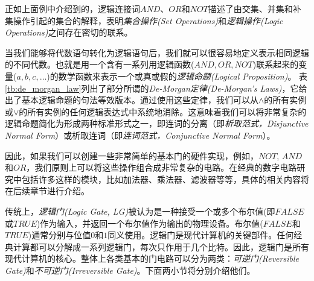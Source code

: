 正如上面例中介绍到的，逻辑连接词$AND$、$OR$和$NOT$描述了由交集、并集和补集操作引起的集合的解释，表明\emph{集合操作(Set Operations)}和\emph{逻辑操作(Logic Operations)}之间存在密切的联系。

当我们能够将代数语句转化为逻辑语句后，我们就可以很容易地定义表示相同逻辑的不同代数。也就是用一个含有一系列用逻辑函数($AND,OR,NOT$)联系起来的变量($a,b,c,\dots$)的数学函数来表示一个或真或假的\emph{逻辑命题(Logical Proposition)}。
表\ref{tb:de_morgan_law}列出了部分所谓的\emph{De-Morgan定律(De-Morgan's Laws)}，它给出了基本逻辑命题的句法等效版本。通过使用这些定律，我们可以从$\wedge$的所有实例或$\vee$的所有实例的任何逻辑表达式中系统地消除。这意味着我们可以将非常复杂的逻辑命题简化为形成两种标准形式之一，即连词的分离（即\emph{析取范式，Disjunctive Normal Form}）或析取连词（即\emph{连词范式，Conjunctive Normal Form}）。

因此，如果我们可以创建一些非常简单的基本门的硬件实现，例如，$NOT$, $AND$和$OR$，我们原则上可以将这些操作组合成非常复杂的电路。在经典的数字电路研究中包括许多这样的模块，比如加法器\cite[]{Mukherjee_Dhar_2014}、乘法器\cite[]{Shu_Haruo_2016}、滤波器\cite[]{Kumar_Agarwal_2021}等等，具体的相关内容将在后续章节进行介绍。

传统上，\emph{逻辑门(Logic Gate, LG)}被认为是一种接受一个或多个布尔值(即$FALSE$或$TRUE$)作为输入，并返回一个布尔值作为输出的物理设备。布尔值($FALSE$和$TRUE$)通常分别与位值$0$和$1$同义使用。逻辑门是现代计算机的关键部件。任何经典计算都可以分解成一系列逻辑门，每次只作用于几个比特。因此，逻辑门是所有现代计算机的核心。整体上各类基本的门电路可以分为两类：\emph{可逆门(Reversible Gate)}和\emph{不可逆门(Irreversible Gate)}。下面两小节将分别介绍他们。

